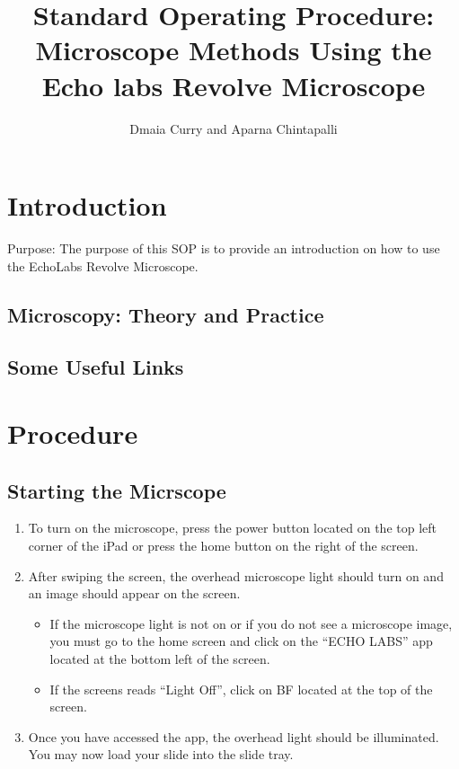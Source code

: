 \documentclass{article}
\title{Standard Operating Procedure: Microscope Methods Using the Echo labs Revolve Microscope}
\author{Dmaia Curry and Aparna Chintapalli}
\begin{document}


\maketitle

\section{Introduction
}
Purpose:
The purpose of this SOP is to provide an introduction on how to use the EchoLabs Revolve Microscope.

\subsection{Microscopy: Theory and Practice}

\subsection{Some Useful Links}


\section{Procedure}

\subsection{Starting the Micrscope}

\begin{enumerate}
  \item To turn on the microscope, press the power button located on the top left corner of the iPad or press the home button on the right of the screen.
  \item After swiping the screen, the overhead microscope light should turn on and an image should appear on the screen.
  
\begin{itemize}
  \item If the microscope light is not on or if you do not see a microscope image, you must go to the home screen and click on the “ECHO LABS” app located at the bottom left of the screen.
  \item If the screens reads “Light Off”, click on BF located at the top of the screen.
\end{itemize}

  \item Once you have accessed the app, the overhead light should be illuminated. You may now load your slide into the slide tray.
\end{enumerate} 
  
\end{document}
